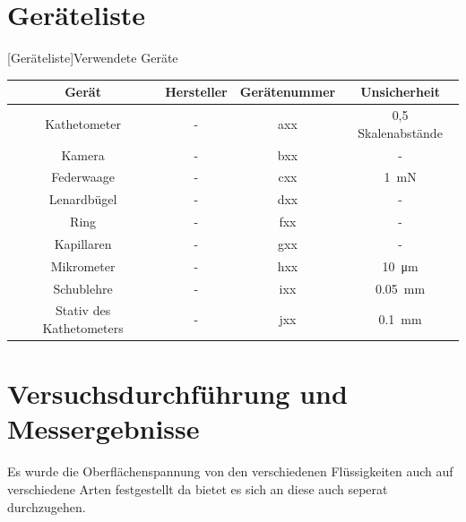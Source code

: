 \documentclass[11pt]{scrartcl}
\begin{document}
    

\section{Geräteliste}
\label{sec:geraeteliste}
\begin{center}
    [Geräteliste]{Verwendete Geräte}  %
    \label{tab:geraeteliste}
    \vspace{3mm}  %
    \begin{tabular}{|c|c|c|c|}
        \hline
        Gerät                    & Hersteller & Gerätenummer & Unsicherheit       \\ \hline
        Kathetometer             & -          & axx          & 0,5 Skalenabstände \\ \hline
        Kamera                   & -          & bxx          & -                  \\ \hline
        Federwaage               & -          & cxx          & \SI{1}{\mN}        \\ \hline
        Lenardbügel              & -          & dxx          & -                  \\ \hline
        Ring                     & -          & fxx          & -                  \\ \hline
        Kapillaren               & -          & gxx          & -                  \\ \hline
        Mikrometer               & -          & hxx          & \SI{10}{\um}       \\ \hline
        Schublehre               & -          & ixx          & \SI{0.05}{\mm}     \\ \hline
        Stativ des Kathetometers & -          & jxx          & \SI{0.1}{\mm}      \\ \hline
        \hline
    \end{tabular}
\end{center}


\section{Versuchsdurchführung und Messergebnisse}
\label{sec:versuchsdurchfuehrung_messergebnisse}
Es wurde die Oberflächenspannung von den verschiedenen Flüssigkeiten 
auch auf verschiedene Arten festgestellt da bietet es sich an diese
auch seperat durchzugehen.
\end{document}
